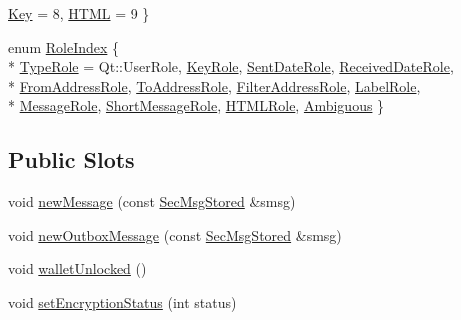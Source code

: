 \begin{DoxyCompactItemize}
\hyperlink{class_message_model_a06abed7ec66ac487a58ca87fd84e2053a7109be637fef36b090f57b6285cb5f04}{Key} = 8, 
\hyperlink{class_message_model_a06abed7ec66ac487a58ca87fd84e2053a21cdf1e17d71ffbf41e55d9fe2bf2d7e}{H\+T\+M\+L} = 9
 \}
\item 
enum \hyperlink{class_message_model_a0d9dd8cb118971ea3ed37cd9cf84b2e3}{Role\+Index} \{ \\*
\hyperlink{class_message_model_a0d9dd8cb118971ea3ed37cd9cf84b2e3ab7fbe93e354957746e56ebb06ff84e8e}{Type\+Role} = Qt\+:\+:User\+Role, 
\hyperlink{class_message_model_a0d9dd8cb118971ea3ed37cd9cf84b2e3a8cf6b70dbc62d5db3500e1aac2ee9902}{Key\+Role}, 
\hyperlink{class_message_model_a0d9dd8cb118971ea3ed37cd9cf84b2e3a18464878ccb612094c65126c30fd70f0}{Sent\+Date\+Role}, 
\hyperlink{class_message_model_a0d9dd8cb118971ea3ed37cd9cf84b2e3aad50f3d8ab2bcca417dba4a285d51d73}{Received\+Date\+Role}, 
\\*
\hyperlink{class_message_model_a0d9dd8cb118971ea3ed37cd9cf84b2e3adb0b890a4cab8e2ccab36900b7dca8af}{From\+Address\+Role}, 
\hyperlink{class_message_model_a0d9dd8cb118971ea3ed37cd9cf84b2e3af1bf26da06172cb73d0f9b50662ff098}{To\+Address\+Role}, 
\hyperlink{class_message_model_a0d9dd8cb118971ea3ed37cd9cf84b2e3a7a8fcd59311ac87d588b81fca1378374}{Filter\+Address\+Role}, 
\hyperlink{class_message_model_a0d9dd8cb118971ea3ed37cd9cf84b2e3aca94175abc1ed61e6911b891e3eac28d}{Label\+Role}, 
\\*
\hyperlink{class_message_model_a0d9dd8cb118971ea3ed37cd9cf84b2e3a3745144b2cbfba76015d1ef2b98565e3}{Message\+Role}, 
\hyperlink{class_message_model_a0d9dd8cb118971ea3ed37cd9cf84b2e3aaa9e495035e17c614e655409b4c70aaa}{Short\+Message\+Role}, 
\hyperlink{class_message_model_a0d9dd8cb118971ea3ed37cd9cf84b2e3a9fe1770d03a7c9ccbc25d883f1c6cdd6}{H\+T\+M\+L\+Role}, 
\hyperlink{class_message_model_a0d9dd8cb118971ea3ed37cd9cf84b2e3a254150a5edd3791c0e9c2b2dd819f209}{Ambiguous}
 \}
\end{DoxyCompactItemize}
\subsection*{Public Slots}
\begin{DoxyCompactItemize}
\item 
void \hyperlink{class_message_model_ad6a392da2be132233531d54e14383dfb}{new\+Message} (const \hyperlink{class_sec_msg_stored}{Sec\+Msg\+Stored} \&smsg)
\item 
void \hyperlink{class_message_model_a7a1396e1047438ce30c8a3a1373d0dfd}{new\+Outbox\+Message} (const \hyperlink{class_sec_msg_stored}{Sec\+Msg\+Stored} \&smsg)
\item 
void \hyperlink{class_message_model_ad4f38a637dda717acc6b3bcec2b8f23f}{wallet\+Unlocked} ()
\item 
void \hyperlink{class_message_model_a4e1d19da83fffaea5883ba3771d62949}{set\+Encryption\+Status} (int status)
\end{DoxyCompactItemize}
